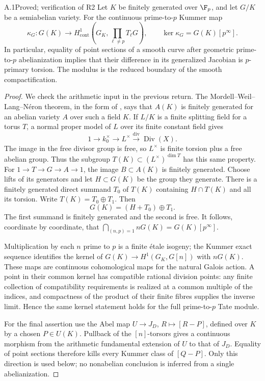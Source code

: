 \begin{claim}{A.1}{Proved; verification of R2}
Let $K$ be finitely generated over $\F_p$, and let $G/K$ be a
semiabelian variety. For the continuous prime-to-$p$ Kummer map
\[
 \kappa_G:G(K)\longrightarrow
 H^1_{\mathrm{cont}}\left(G_K,\prod_{\ell\ne p}T_\ell G\right),
 \qquad
 \ker\kappa_G=G(K)[p^\infty].
\]
In particular, equality of point sections of a smooth curve after
geometric prime-to-$p$ abelianization implies that their difference in
its generalized Jacobian is $p$-primary torsion. The modulus is the
reduced boundary of the smooth compactification.
\end{claim}
\begin{proof}
We check the arithmetic input in the previous return. The
Mordell--Weil--Lang--N\'eron theorem, in the form of
\citet[I, Theorem 16.7]{A_Milne2008}, says that $A(K)$ is finitely
generated for an abelian variety $A$ over such a field $K$.
If $L/K$ is a finite splitting field for a torus $T$, a normal proper
model of $L$ over its finite constant field gives
\[
 1\longrightarrow k_0^\times\longrightarrow L^\times
 \xrightarrow{\operatorname{div}}\operatorname{Div}(X).
\]
The image in the free divisor group is free, so $L^\times$ is finite
torsion plus a free abelian group. Thus the subgroup
$T(K)\subset (L^\times)^{\dim T}$ has this same property.
For $1\to T\to G\to A\to1$, the image $B\subset A(K)$ is finitely
generated. Choose lifts of its generators and let $H\subset G(K)$ be
the group they generate. There is a finitely generated direct summand
$T_0$ of $T(K)$ containing $H\cap T(K)$ and all its torsion. Write
$T(K)=T_0\oplus T_1$. Then
\[
 G(K)=(H+T_0)\oplus T_1.
\]
The first summand is finitely generated and the second is free. It
follows, coordinate by coordinate, that
$\bigcap_{(n,p)=1}nG(K)=G(K)[p^\infty]$.

Multiplication by each $n$ prime to $p$ is a finite \'etale isogeny;
the Kummer exact sequence identifies the kernel of
$G(K)\to H^1(G_K,G[n])$ with $nG(K)$. These maps are continuous
cohomological maps for the natural Galois action. A point in their
common kernel has compatible rational division points: any finite
collection of compatibility requirements is realized at a common
multiple of the indices, and compactness of the product of their
finite fibres supplies the inverse limit. Hence the same kernel
statement holds for the full prime-to-$p$ Tate module.

For the final assertion use the Abel map
$U\to J_D$, $R\mapsto[R-P]$, defined over $K$ by a chosen
$P\in U(K)$. Pullback of the $[n]$-torsors gives a continuous
morphism from the arithmetic fundamental extension of $U$ to that of
$J_D$. Equality of point sections therefore kills every Kummer class
of $[Q-P]$. Only this direction is used below; no nonabelian conclusion
is inferred from a single abelianization.
\end{proof}

